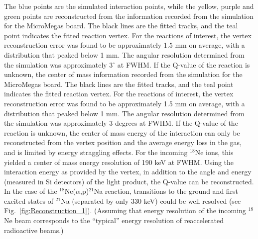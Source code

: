 \documentclass[final,number,sort&compress,5p,times,twocolumn]{elsarticle}
\begin{document}
The blue points are the simulated interaction points, while the yellow, purple and green points are reconstructed from the
information recorded from the simulation for the MicroMegas board. The black lines are the
fitted tracks, and the teal point indicates the fitted reaction vertex. For the reactions of interest,
the vertex reconstruction error was found to be approximately 1.5 mm on average, with a
distribution that peaked below 1 mm. The angular resolution determined from the simulation was
approximately 3$^{\circ}$ at FWHM. If the Q-value of the reaction is unknown, the center of mass
information recorded from the simulation for the MicroMegas board. The black lines are the
fitted tracks, and the teal point indicates the fitted reaction vertex. For the reactions of interest,
the vertex reconstruction error was found to be approximately 1.5 mm on average, with a
distribution that peaked below 1 mm. The angular resolution determined from the simulation was
approximately 3 degrees at FWHM. If the Q-value of the reaction is unknown, the center of mass
energy of the interaction can only be reconstructed from the vertex position and the average
energy loss in the gas, and is limited by energy straggling effects. For the incoming $^{18}$Ne ions,
this yielded a center of mass energy resolution of 190 keV at FWHM. Using the interaction
energy as provided by the vertex, in addition to the angle and energy (measured in Si detectors) of
the light product, the Q-value can be reconstructed. In the case of the $^{18}$Ne($\alpha$,p)$^{21}$Na reaction,
transitions to the ground and first excited states of $^{21}$Na (separated by only 330 keV) could be
well resolved (see Fig.~\ref{fig:Reconstruction_1}). (Assuming that energy resolution of the incoming $^{18}$Ne 
beam corresponds to the ``typical'' energy resolution of reaccelerated radioactive beams.)
\end{document}
